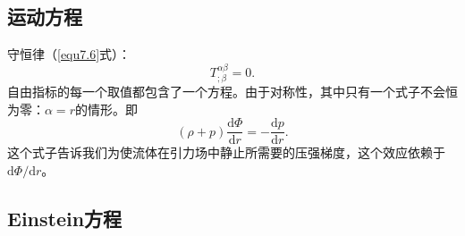 \subsection*{运动方程}
守恒律（\eqref{equ7.6}式）：
\begin{equation}
T^{\alpha\beta}_{;\beta}=0.
\end{equation}
自由指标的每一个取值都包含了一个方程。由于对称性，其中只有一个式子不会恒为零：$\alpha=r$的情形。即
\begin{equation}
(\rho+p)\frac{\mathrm d\Phi}{\mathrm dr}=-\frac{\mathrm dp}{\mathrm dr}.
\end{equation}
这个式子告诉我们为使流体在引力场中静止所需要的压强梯度，这个效应依赖于$\mathrm d\Phi/\mathrm dr$。
\subsection*{Einstein方程}